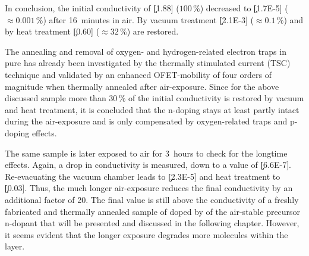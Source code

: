 In conclusion, the initial conductivity of \c[1.88] (\mbox{$100\,\%$}) decreased to \c[1.7E-5] (\mbox{$\approx0.001\,\%$}) after 16~minutes in air. By vacuum treatment \c[2.1E-3] (\mbox{$\approx0.1\,\%$}) and by heat treatment \c[0.60] (\mbox{$\approx32\,\%$}) are restored.

The annealing and removal of oxygen- and hydrogen-related electron traps in pure \CS has already been investigated by the thermally stimulated current (TSC) technique and validated by an enhanced OFET-mobility of four orders of magnitude when thermally annealed after air-exposure\cite{Matsushima2007}. Since for the above discussed sample more than 30\,\% of the initial conductivity is restored by vacuum and heat treatment, it is concluded that the n-doping stays at least partly intact during the air-exposure and is only compensated by oxygen-related traps and p-doping effects.

The same sample is later exposed to air for 3~hours to check for the longtime effects. Again, a drop in conductivity is measured, down to a value of \c[6.6E-7]. Re-evacuating the vacuum chamber leads to \c[2.3E-5] and heat treatment to \c[0.03]. Thus, the much longer air-exposure reduces the final conductivity by an additional factor of 20. The final value is still above the conductivity of a freshly fabricated and thermally annealed sample of \CS doped by \C[0.014] of the air-stable precursor n-dopant \aob that will be presented and discussed in the following chapter. However, it seems evident that the longer exposure degrades more \WPd molecules within the \CS layer.

